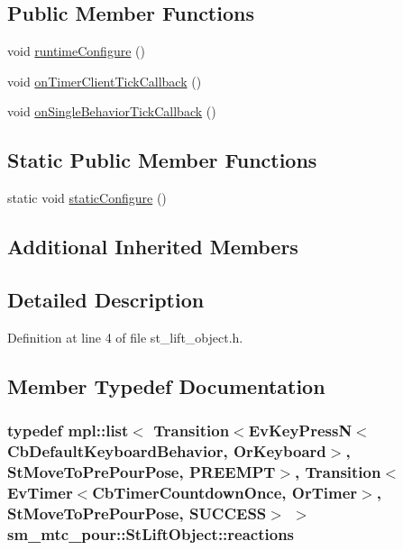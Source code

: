 \subsection*{Public Member Functions}
\begin{DoxyCompactItemize}
\item 
void \hyperlink{structsm__mtc__pour_1_1StLiftObject_af796b08f23fba617b66c9f2d38d945b4}{runtime\+Configure} ()
\item 
void \hyperlink{structsm__mtc__pour_1_1StLiftObject_a69b70fe8221d74ebf2bbbdb617b7ba2a}{on\+Timer\+Client\+Tick\+Callback} ()
\item 
void \hyperlink{structsm__mtc__pour_1_1StLiftObject_abf9d56ad7af04a5ff6e0bea8a383747c}{on\+Single\+Behavior\+Tick\+Callback} ()
\end{DoxyCompactItemize}
\subsection*{Static Public Member Functions}
\begin{DoxyCompactItemize}
\item 
static void \hyperlink{structsm__mtc__pour_1_1StLiftObject_a8977bf7fa82c2056540833d173d254a0}{static\+Configure} ()
\end{DoxyCompactItemize}
\subsection*{Additional Inherited Members}


\subsection{Detailed Description}


Definition at line 4 of file st\+\_\+lift\+\_\+object.\+h.



\subsection{Member Typedef Documentation}
\subsubsection[{\texorpdfstring{reactions}{reactions}}]{\setlength{\rightskip}{0pt plus 5cm}typedef mpl\+::list$<$ Transition$<$Ev\+Key\+PressN$<$Cb\+Default\+Keyboard\+Behavior, {\bf Or\+Keyboard}$>$, {\bf St\+Move\+To\+Pre\+Pour\+Pose}, {\bf P\+R\+E\+E\+M\+PT}$>$, Transition$<$Ev\+Timer$<$Cb\+Timer\+Countdown\+Once, {\bf Or\+Timer}$>$, {\bf St\+Move\+To\+Pre\+Pour\+Pose}, {\bf S\+U\+C\+C\+E\+SS}$>$ $>$ {\bf sm\+\_\+mtc\+\_\+pour\+::\+St\+Lift\+Object\+::reactions}}\hypertarget{structsm__mtc__pour_1_1StLiftObject_af88d0c09bc3731ad7a14be4543f48e37}{}\label{structsm__mtc__pour_1_1StLiftObject_af88d0c09bc3731ad7a14be4543f48e37}


